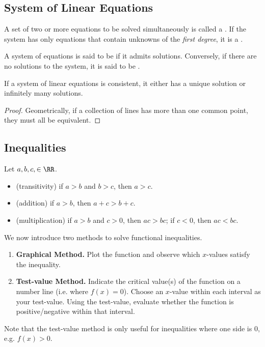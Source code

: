 \subsection{System of Linear Equations}

\begin{definition}
    A set of two or more equations to be solved simultaneously is called a . If the system has only equations that contain unknowns of the \textit{first degree}, it is a .
\end{definition}

\begin{definition}
    A system of equations is said to be  if it admits solutions. Conversely, if there are no solutions to the system, it is said to be .
\end{definition}

\begin{theorem}
    If a system of linear equations is consistent, it either has a unique solution or infinitely many solutions.
\end{theorem}
\begin{proof}
    Geometrically, if a collection of lines has more than one common point, they must all be equivalent.
\end{proof}

\subsection{Inequalities}

\begin{fact}
    Let $a, b, c, \in \RR$.
    \begin{itemize}
        \item (transitivity) if $a > b$ and $b > c$, then $a > c$.
        \item (addition) if $a > b$, then $a + c > b + c$.
        \item (multiplication) if $a > b$ and $c > 0$, then $ac > bc$; if $c < 0$, then $ac < bc$.
    \end{itemize}
\end{fact}

We now introduce two methods to solve functional inequalities.
\begin{enumerate}
    \item \textbf{Graphical Method.} Plot the function and observe which $x$-values satisfy the inequality.
    \item \textbf{Test-value Method.} Indicate the critical value(s) of the function on a number line (i.e. where $f(x) = 0$). Choose an $x$-value within each interval as your test-value. Using the test-value, evaluate whether the function is positive/negative within that interval.
\end{enumerate}
Note that the test-value method is only useful for inequalities where one side is 0, e.g. $f(x) > 0$.

